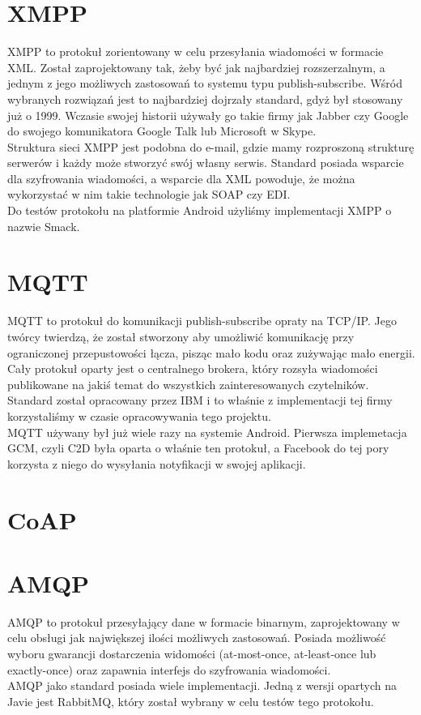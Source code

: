 \documentclass[twoside]{article}
\begin{document}
\begin{multicols}{2}
\section{XMPP}
XMPP to protokuł zorientowany w celu przesyłania wiadomości w formacie XML. Został zaprojektowany tak, żeby być jak najbardziej rozszerzalnym, a jednym z jego możliwych zastosowań to systemu typu publish-subscribe. Wśród wybranych rozwiązań jest to najbardziej dojrzały standard, gdyż był stosowany już o 1999. Wczasie swojej historii używały go takie firmy jak Jabber czy Google do swojego komunikatora Google Talk lub Microsoft w Skype.
\\ Struktura sieci XMPP jest podobna do e-mail, gdzie mamy rozproszoną strukturę serwerów i każdy może stworzyć swój własny serwis. Standard posiada wsparcie dla szyfrowania wiadomości, a wsparcie dla XML powoduje, że można wykorzystać w nim takie technologie jak SOAP czy EDI.
\\ Do testów protokołu na platformie Android użyliśmy implementacji XMPP o nazwie Smack.

\section{MQTT}
MQTT to protokuł do komunikacji publish-subscribe opraty na TCP/IP. Jego twórcy twierdzą, że został stworzony aby umożliwić komunikację przy ograniczonej przepustowości łącza, pisząc mało kodu oraz zużywając mało energii. Cały protokuł oparty jest o centralnego brokera, który rozsyła wiadomości publikowane na jakiś temat do wszystkich zainteresowanych czytelników. Standard został opracowany przez IBM i to właśnie z implementacji tej firmy korzystaliśmy w czasie opracowywania tego projektu.
\\ MQTT używany był już wiele razy na systemie Android. Pierwsza implemetacja GCM, czyli C2D była oparta o właśnie ten protokuł, a Facebook do tej pory korzysta z niego do wysyłania notyfikacji w swojej aplikacji.

\section{CoAP}

\section{AMQP}
AMQP to protokuł przesyłający dane w formacie binarnym, zaprojektowany w celu obsługi jak największej ilości możliwych zastosowań. Posiada możliwość wyboru gwarancji dostarczenia widomości (at-most-once, at-least-once lub exactly-once) oraz zapawnia interfejs do szyfrowania wiadomości.
\\ AMQP jako standard posiada wiele implementacji. Jedną z wersji opartych na Javie jest RabbitMQ, który został wybrany w celu testów tego protokołu.


\end{multicols}
\end{document}
